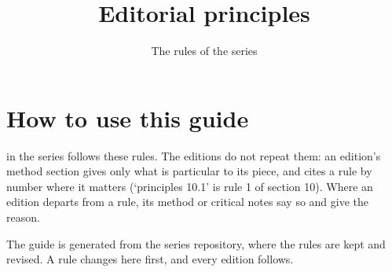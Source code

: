 \documentclass[guide]{pol-ren}
\title[Editorial principles]{Editorial principles}
\subtitle{The rules of the series}
\begin{document}
\maketitlepage
\colophon

\section*{How to use this guide}

 in the series follows these rules. The editions do
not repeat them: an edition's method section gives only what is particular
to its piece, and cites a rule by number where it matters (‘principles
10.1’ is rule 1 of section 10). Where an edition departs from a rule, its
method or critical notes say so and give the reason.

The guide is generated from the series repository, where the rules are kept
and revised. A rule changes here first, and every edition follows.


\end{document}
